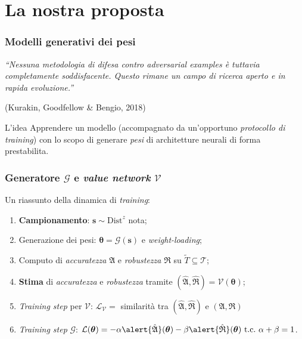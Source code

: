 \documentclass{beamer}
\begin{document}
\section{La nostra proposta}{

\begin{frame}
	\frametitle{Modelli generativi dei pesi}
	\begin{displayquote}
		\textit{``Nessuna metodologia di difesa contro \textit{adversarial examples} è tuttavia completamente soddisfacente. Questo rimane un campo di ricerca aperto e in rapida evoluzione.”}\\
		{\raggedleft(Kurakin, Goodfellow \& Bengio, 2018)\par}
	\end{displayquote}

\hfill\break

\begin{block}{L'idea}
	Apprendere un modello (accompagnato da un'opportuno \textit{protocollo di training}) con lo scopo di \alert{generare \textit{pesi} di architetture neurali} di forma prestabilita.
\end{block}




\end{frame}


\begin{frame}
	\frametitle{Generatore $\mathcal{G}$ e \textit{value network} $\mathcal{V}$}
	Un riassunto della dinamica di \textit{training}:
	\hfill\break

	\begin{enumerate}
		\item \textbf{Campionamento}: $\boldsymbol{s} \sim \text{Dist}^{z}$ nota;
		\item Generazione dei pesi:  $\boldsymbol{\theta} = \mathcal{G}(\boldsymbol{s})$ e \textit{weight-loading};
		\item Computo di \textit{accuratezza} $\mathfrak{A}$ e \textit{robustezza} $\mathfrak{R}$ su $\tilde{T} \subseteq \mathcal{T}$;
		\item \textbf{Stima} di \textit{accuratezza} e \textit{robustezza} tramite $(\hat{\mathfrak{A}},\hat{\mathfrak{R}}) = \mathcal{V}(\boldsymbol{\theta})$;
		\item \textit{Training step} per $\mathcal{V}$: $\mathcal{L}_{\mathcal{V}} = $ similarità tra $(\hat{\mathfrak{A}},\hat{\mathfrak{R}})$ e $({\mathfrak{A}},{\mathfrak{R}})$
		\item \textit{Training step} $\mathcal{G}$: $\mathcal{L}(\boldsymbol{\theta}) =  -\alpha \alert{\hat{\mathfrak{A}}}(\boldsymbol{\theta}) - \beta \alert{\hat{\mathfrak{R}}}(\boldsymbol{\theta}) \ \text{t.c.}\ \alpha + \beta = 1$.
	\end{enumerate}
\end{frame}

}
\end{document}
